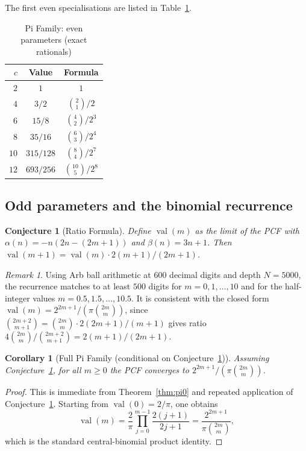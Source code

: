 \documentclass[11pt,a4paper]{article}
\theoremstyle{plain}
\newtheorem{corollary}[theorem]{Corollary}
\newtheorem{conjecture}[theorem]{Conjecture}
\theoremstyle{definition}
\theoremstyle{remark}
\newtheorem{remark}[theorem]{Remark}
\begin{document}
The first even specialisations are listed in Table~\ref{tab:parity}.

\begin{table}[ht]
\centering
\caption{Pi Family: even parameters (exact rationals)}\label{tab:parity}
\begin{tabular}{@{}rcc@{}}
\toprule
$c$ & Value & Formula \\
\midrule
$2$ & $1$ & $1$ \\
$4$ & $3/2$ & $\binom{2}{1}/2$ \\
$6$ & $15/8$ & $\binom{4}{2}/2^3$ \\
$8$ & $35/16$ & $\binom{6}{3}/2^4$ \\
$10$ & $315/128$ & $\binom{8}{4}/2^7$ \\
$12$ & $693/256$ & $\binom{10}{5}/2^8$ \\
\bottomrule
\end{tabular}
\end{table}

\subsection{Odd parameters and the binomial recurrence}

\begin{conjecture}[Ratio Formula]\label{conj:ratio}
Define $\operatorname{val}(m)$ as the limit of the PCF with
$\alpha(n) = -n(2n{-}(2m{+}1))$ and $\beta(n) = 3n+1$.
Then $\operatorname{val}(m{+}1) = \operatorname{val}(m)\cdot 2(m{+}1)/(2m{+}1)$.
\end{conjecture}

\begin{remark}
Using Arb ball arithmetic at $600$ decimal digits and depth $N=5000$,
the recurrence matches to at least $500$ digits for $m = 0,1,\ldots,10$
and for the half-integer values $m = 0.5,1.5,\ldots,10.5$.
It is consistent with the closed form
$\operatorname{val}(m) = 2^{2m+1}/(\pi\binom{2m}{m})$, since
$\binom{2m+2}{m+1} = \binom{2m}{m}\cdot 2(2m{+}1)/(m{+}1)$ gives
ratio $4\binom{2m}{m}/\binom{2m+2}{m+1} = 2(m{+}1)/(2m{+}1)$.
\end{remark}

\begin{corollary}[Full Pi Family {\normalfont(conditional on Conjecture~\ref{conj:ratio})}]\label{cor:pi}
Assuming Conjecture~\ref{conj:ratio}, for all $m \ge 0$ the PCF
converges to $2^{2m+1}/(\pi\binom{2m}{m})$.
\end{corollary}

\begin{proof}
This is immediate from Theorem~\ref{thm:pi0} and repeated application of
Conjecture~\ref{conj:ratio}. Starting from $\operatorname{val}(0)=2/\pi$,
one obtains
\[
  \operatorname{val}(m)=\frac{2}{\pi}\prod_{j=0}^{m-1}\frac{2(j+1)}{2j+1}
  = \frac{2^{2m+1}}{\pi\binom{2m}{m}},
\]
which is the standard central-binomial product identity.
\end{proof}
\end{document}
